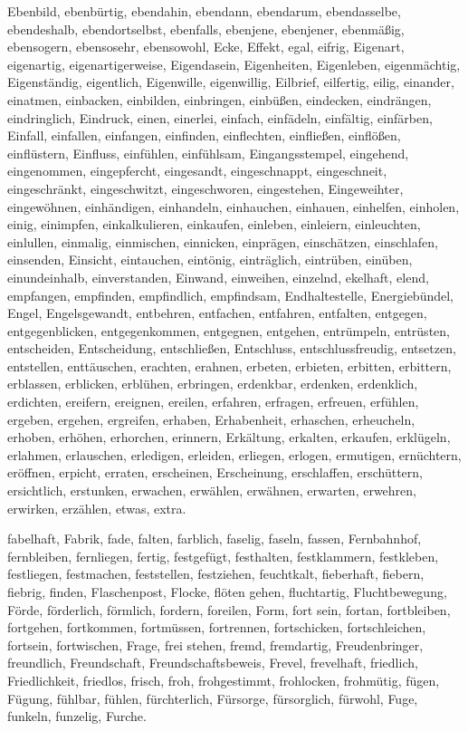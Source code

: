 \documentclass[a4paper,10pt,fleqn,twocolumn,twoside,dvipdfmx]{scrartcl}
\begin{document}
Ebenbild,
ebenbürtig,
ebendahin,
ebendann,
ebendarum,
ebendasselbe,
ebendeshalb,
ebendortselbst,
ebenfalls,
ebenjene,
ebenjener,
ebenmäßig,
ebensogern,
ebensosehr,
ebensowohl,
Ecke,
Effekt,
egal,
eifrig,
Eigenart,
eigenartig,
eigenartigerweise,
Eigendasein,
Eigenheiten,
Eigenleben,
eigenmächtig,
Eigenständig,
eigentlich,
Eigenwille,
eigenwillig,
Eilbrief,
eilfertig,
eilig,
einander,
einatmen,
einbacken,
einbilden,
einbringen,
einbüßen,
eindecken,
eindrängen,
eindringlich,
Eindruck,
einen,
einerlei,
einfach,
einfädeln,
einfältig,
einfärben,
Einfall,
einfallen,
einfangen,
einfinden,
einflechten,
einfließen,
einflößen,
einflüstern,
Einfluss,
einfühlen,
einfühlsam,
Eingangsstempel,
eingehend,
eingenommen,
eingepfercht,
eingesandt,
eingeschnappt,
eingeschneit,
eingeschränkt,
eingeschwitzt,
eingeschworen,
eingestehen,
Eingeweihter,
eingewöhnen,
einhändigen,
einhandeln,
einhauchen,
einhauen,
einhelfen,
einholen,
einig,
einimpfen,
einkalkulieren,
einkaufen,
einleben,
einleiern,
einleuchten,
einlullen,
einmalig,
einmischen,
einnicken,
einprägen,
einschätzen,
einschlafen,
einsenden,
Einsicht,
eintauchen,
eintönig,
einträglich,
eintrüben,
einüben,
einundeinhalb,
einverstanden,
Einwand,
einweihen,
einzelnd,
ekelhaft,
elend,
empfangen,
empfinden,
empfindlich,
empfindsam,
Endhaltestelle,
Energiebündel,
Engel,
Engelsgewandt,
entbehren,
entfachen,
entfahren,
entfalten,
entgegen,
entgegenblicken,
entgegenkommen,
entgegnen,
entgehen,
entrümpeln,
entrüsten,
entscheiden,
Entscheidung,
entschließen,
Entschluss,
entschlussfreudig,
entsetzen,
entstellen,
enttäuschen,
erachten,
erahnen,
erbeten,
erbieten,
erbitten,
erbittern,
erblassen,
erblicken,
erblühen,
erbringen,
erdenkbar,
erdenken,
erdenklich,
erdichten,
ereifern,
ereignen,
ereilen,
erfahren,
erfragen,
erfreuen,
erfühlen,
ergeben,
ergehen,
ergreifen,
erhaben,
Erhabenheit,
erhaschen,
erheucheln,
erhoben,
erhöhen,
erhorchen,
erinnern,
Erkältung,
erkalten,
erkaufen,
erklügeln,
erlahmen,
erlauschen,
erledigen,
erleiden,
erliegen,
erlogen,
ermutigen,
ernüchtern,
eröffnen,
erpicht,
erraten,
erscheinen,
Erscheinung,
erschlaffen,
erschüttern,
ersichtlich,
erstunken,
erwachen,
erwählen,
erwähnen,
erwarten,
erwehren,
erwirken,
erzählen,
etwas,
extra.

fabelhaft,
Fabrik,
fade,
falten,
farblich,
faselig,
faseln,
fassen,
Fernbahnhof,
fernbleiben,
fernliegen,
fertig,
festgefügt,
festhalten,
festklammern,
festkleben,
festliegen,
festmachen,
feststellen,
festziehen,
feuchtkalt,
fieberhaft,
fiebern,
fiebrig,
finden,
Flaschenpost,
Flocke,
flöten gehen,
fluchtartig,
Fluchtbewegung,
Förde,
förderlich,
förmlich,
fordern,
foreilen,
Form,
fort sein,
fortan,
fortbleiben,
fortgehen,
fortkommen,
fortmüssen,
fortrennen,
fortschicken,
fortschleichen,
fortsein,
fortwischen,
Frage,
frei stehen,
fremd,
fremdartig,
Freudenbringer,
freundlich,
Freundschaft,
Freundschaftsbeweis,
Frevel,
frevelhaft,
friedlich,
Friedlichkeit,
friedlos,
frisch,
froh,
frohgestimmt,
frohlocken,
frohmütig,
fügen,
Fügung,
fühlbar,
fühlen,
fürchterlich,
Fürsorge,
fürsorglich,
fürwohl,
Fuge,
funkeln,
funzelig,
Furche.
\end{document}
